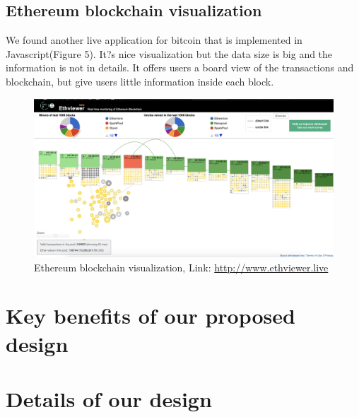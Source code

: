 \documentclass[journal, a4paper]{IEEEtran}
\begin{document}
\subsection{Ethereum blockchain visualization}
We found another live application for bitcoin that is implemented in Javascript(Figure 5). It?s nice visualization but the data size is big and the information is not in details. It offers users a board view of the transactions and blockchain, but give users little information inside each block.
\begin{figure}[!hbt]
		\begin{center}
		\includegraphics[width=\columnwidth]{ethereum.png}
		\caption{Ethereum blockchain visualization, Link: \href{http://www.ethviewer.live}{http://www.ethviewer.live}}
		\label{fig:Ethereum blockchain visualization}
		\end{center}
	\end{figure}

\section{Key benefits of our proposed design}

\section{Details of our design}
\end{document}
